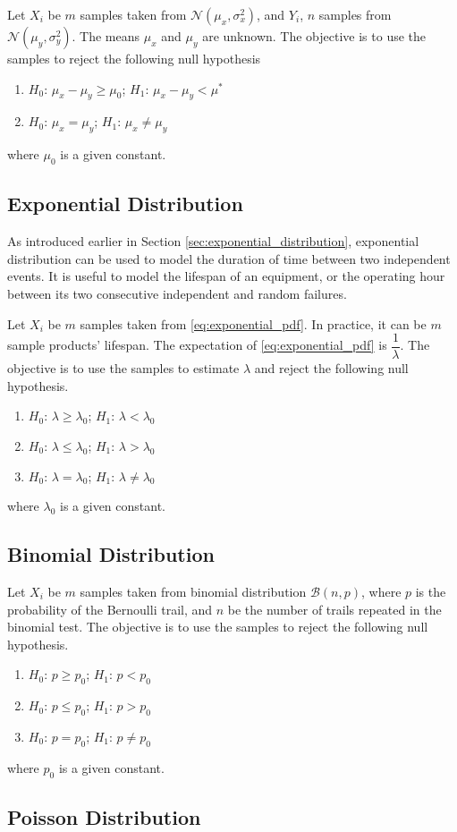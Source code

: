 Let $X_i$ be $m$ samples taken from $\mathcal{N}(\mu_x, \sigma_x^2)$, and $Y_i$, $n$ samples from $\mathcal{N}(\mu_y, \sigma_y^2)$. The means $\mu_x$ and $\mu_y$ are unknown. The objective is to use the samples to reject the following null hypothesis
\begin{enumerate}
	\item $H_0$: $\mu_x - \mu_y \geq \mu_0$; $H_1$: $\mu_x - \mu_y < \mu^*$
	\item $H_0$: $\mu_x = \mu_y$; $H_1$: $\mu_x \neq \mu_y$
\end{enumerate} 
where $\mu_0$ is a given constant.

\subsection{Exponential Distribution}

As introduced earlier in Section \ref{sec:exponential_distribution}, exponential distribution can be used to model the duration of time between two independent events. It is useful to model the lifespan of an equipment, or the operating hour between its two consecutive independent and random failures.

Let $X_i$ be $m$ samples taken from \eqref{eq:exponential_pdf}. In practice, it can be $m$ sample products' lifespan. The expectation of \eqref{eq:exponential_pdf} is $\dfrac{1}{\lambda}$. The objective is to use the samples to estimate $\lambda$ and reject the following null hypothesis.
\begin{enumerate}
	\item $H_0$: $\lambda \geq \lambda_0$; $H_1$: $\lambda < \lambda_0$
	\item $H_0$: $\lambda \leq \lambda_0$; $H_1$: $\lambda > \lambda_0$
	\item $H_0$: $\lambda = \lambda_0$; $H_1$: $\lambda \neq \lambda_0$
\end{enumerate}
where $\lambda_0$ is a given constant.

\subsection{Binomial Distribution}

Let $X_i$ be $m$ samples taken from binomial distribution $\mathcal{B}(n,p)$, where $p$ is the probability of the Bernoulli trail, and $n$ be the number of trails repeated in the binomial test. The objective is to use the samples to reject the following null hypothesis.
\begin{enumerate}
	\item $H_0$: $p \geq p_0$; $H_1$: $p < p_0$
	\item $H_0$: $p \leq p_0$; $H_1$: $p > p_0$
	\item $H_0$: $p = p_0$; $H_1$: $p \neq p_0$
\end{enumerate}
where $p_0$ is a given constant.

\subsection{Poisson Distribution}